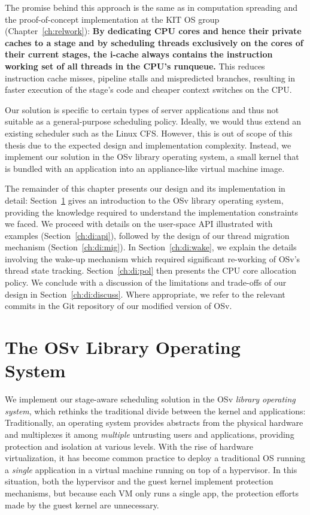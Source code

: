 \documentclass[12pt,a4paper]{book}
\begin{document}
The promise behind this approach is the same as in computation spreading and the proof-of-concept implementation at the KIT OS group (Chapter~\ref{ch:relwork}):
\textbf{By dedicating CPU cores and hence their private caches to a stage and by scheduling threads exclusively on the cores of their current stages, the i-cache always contains the instruction working set of all threads in the CPU's runqueue.}
This reduces instruction cache misses, pipeline stalls and mispredicted branches, resulting in faster execution of the stage's code and cheaper context switches on the CPU. 

Our solution is specific to certain types of server applications and thus not suitable as a general-purpose scheduling policy.
Ideally, we would thus extend an existing scheduler such as the Linux CFS.
However, this is out of scope of this thesis due to the expected design and implementation complexity.
Instead, we implement our solution in the OSv library operating system, a small kernel that is bundled with an application into an appliance-like virtual machine image.

The remainder of this chapter presents our design and its implementation in detail:
Section~\ref{ch:di:osv} gives an introduction to the OSv library operating system, providing the knowledge required to understand the implementation constraints we faced.
We proceed with details on the user-space API illustrated with examples (Section~\ref{ch:di:api}), followed by the design of our thread migration mechanism (Section~\ref{ch:di:mig}).
In Section~\ref{ch:di:wake}, we explain the details involving the wake-up mechanism which required significant re-working of OSv's thread state tracking.
Section~\ref{ch:di:pol} then presents the CPU core allocation policy.
We conclude with a discussion of the limitations and trade-offs of our design in Section~\ref{ch:di:discuss}.
Where appropriate, we refer to the relevant commits in the Git repository of our modified version of OSv.

\section{The OSv Library Operating System}\label{ch:di:osv}
We implement our stage-aware scheduling solution in the OSv \emph{library operating system}, which rethinks the traditional divide between the kernel and applications:
Traditionally, an operating system provides abstracts from the physical hardware and multiplexes it among \emph{multiple} untrusting users and applications, providing protection and isolation at various levels.
With the rise of hardware virtualization, it has become common practice to deploy a traditional OS running a \emph{single} application in a virtual machine running on top of a hypervisor.
In this situation, both the hypervisor and the guest kernel implement protection mechanisms, but because each VM only runs a single app, the protection efforts made by the guest kernel are unnecessary. 
\end{document}
